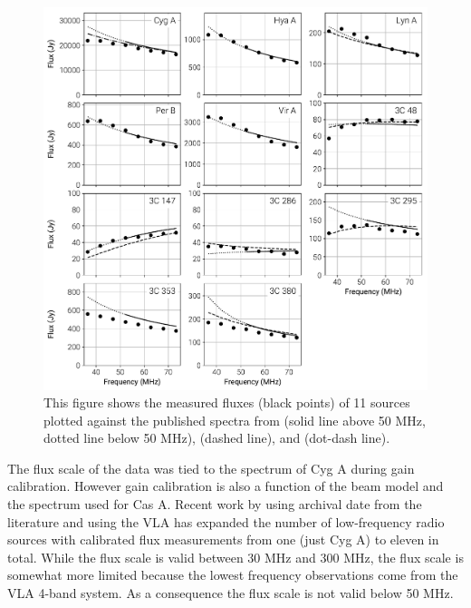 \documentclass[twocolumn]{aastex61}
\begin{document}
\begin{figure}[t]
    \includegraphics[width=\textwidth]{figures/flux-scale/flux-scale}
    \caption{
        This figure shows the measured fluxes (black points) of 11 sources plotted against the
        published spectra from \citet{2017ApJS..230....7P} (solid line above 50 MHz, dotted line
        below 50 MHz), \citet{2012MNRAS.423L..30S} (dashed line), and \citet{1977A&A....61...99B}
        (dot-dash line).
    }
    \label{fig:flux-scale}
\end{figure}

The flux scale of the data was tied to the \citet{1977A&A....61...99B} spectrum of Cyg A during gain
calibration. However gain calibration is also a function of the beam model and the spectrum used for
Cas A. Recent work by \citet{2012MNRAS.423L..30S} using archival date from the literature and
\citet{2017ApJS..230....7P} using the VLA has expanded the number of low-frequency radio sources
with calibrated flux measurements from one (just Cyg A) to eleven in total. While the
\citet{2012MNRAS.423L..30S} flux scale is valid between 30 MHz and 300 MHz, the
\citet{2017ApJS..230....7P} flux scale is somewhat more limited because the lowest frequency
observations come from the VLA 4-band system. As a consequence the \citet{2017ApJS..230....7P} flux
scale is not valid below 50 MHz.
\end{document}

